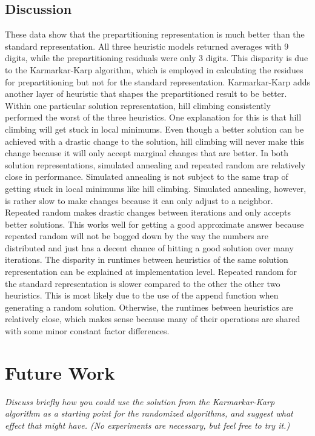 \documentclass[a4paper]{article}
\begin{document}
	\subsection{Discussion}
	These data show that the prepartitioning representation is much better than the standard representation. All three heuristic models returned averages with 9 digits, while the prepartitioning residuals were only 3 digits. This disparity is due to the Karmarkar-Karp algorithm, which is employed in calculating the residues for prepartitioning but not for the standard representation. Karmarkar-Karp adds another layer of heuristic that shapes the prepartitioned result to be better. Within one particular solution representation, hill climbing consistently performed the worst of the three heuristics. One explanation for this is that hill climbing will get stuck in local minimums. Even though a better solution can be achieved with a drastic change to the solution, hill climbing will never make this change because it will only accept marginal changes that are better. In both solution representations, simulated annealing and repeated random are relatively close in performance. Simulated annealing is not subject to the same trap of getting stuck in local minimums like hill climbing. Simulated annealing, however, is rather slow to make changes because it can only adjust to a neighbor. Repeated random makes drastic changes between iterations and only accepts better solutions. This works well for getting a good approximate answer because repeated random will not be bogged down by the way the numbers are distributed and just has a decent chance of hitting a good solution over many iterations. The disparity in runtimes between heuristics of the same solution representation can be explained at implementation level. Repeated random for the standard representation is slower compared to the other the other two heuristics. This is most likely due to the use of the append function when generating a random solution. Otherwise, the runtimes between heuristics are relatively close, which makes sense because many of their operations are shared with some minor constant factor differences.
	

	
	\section{Future Work}
	\textit{Discuss briefly how you could use the solution from the Karmarkar-Karp algorithm as a starting point for the randomized algorithms, and suggest what effect that might have. (No experiments are necessary, but feel free to try it.)}
	
\end{document}
